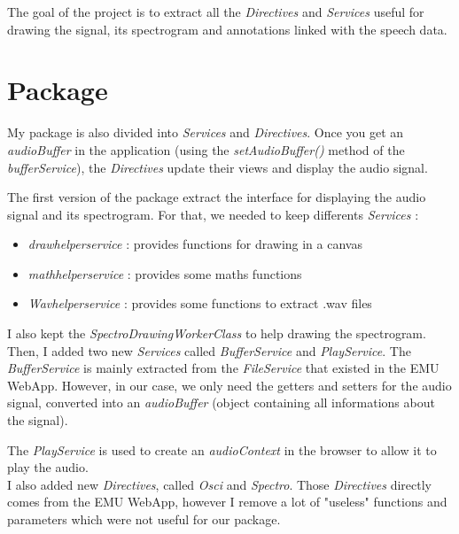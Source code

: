 \documentclass{article}
\begin{document}
The goal of the project is to extract all the \textit{Directives} and \textit{Services} useful for drawing the signal, its spectrogram and annotations linked with the speech data. 


\section{Package}

My package is also divided into \textit{Services} and \textit{Directives}. Once you get an \textit{audioBuffer} in the application (using the \textit{setAudioBuffer()} method of the \textit{bufferService}), the \textit{Directives} update their views and display the audio signal.

The first version of the package extract the interface for displaying the audio signal and its spectrogram. For that, we needed to keep differents \textit{Services} :
\begin{itemize}
\item \textit{drawhelperservice} : provides functions for drawing in a canvas
\item \textit{mathhelperservice} : provides some maths functions
\item \textit{Wavhelperservice} : provides some functions to extract .wav files
\end{itemize}

I also kept the \textit{SpectroDrawingWorkerClass} to help drawing the spectrogram.\\

Then, I added two new \textit{Services} called \textit{BufferService} and \textit{PlayService}. The \textit{BufferService} is mainly extracted from the \textit{FileService} that existed in the EMU WebApp. However, in our case, we only need the getters and setters for the audio signal, converted into an \textit{audioBuffer} (object containing all informations about the signal). 

The \textit{PlayService} is used to create an \textit{audioContext} in the browser to allow it to play the audio.\\

I also added new \textit{Directives}, called \textit{Osci} and \textit{Spectro}. Those \textit{Directives} directly comes from the EMU WebApp, however I remove a lot of "useless" functions and parameters which were not useful for our package. 
\end{document}
